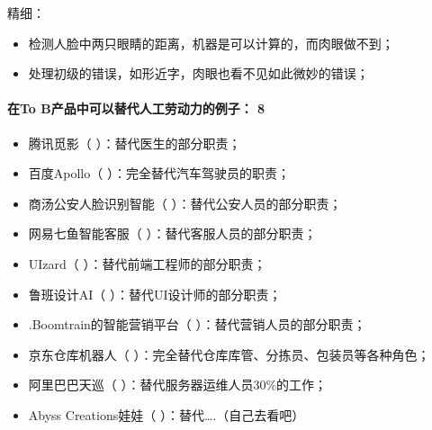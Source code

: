 \documentclass[letterpaper,10pt,english]{sphinxmanual}
\begin{document}
精细：
\begin{itemize}
\item {} 
检测人脸中两只眼睛的距离，机器是可以计算的，而肉眼做不到；

\item {} 
处理初级的错误，如形近字，肉眼也看不见如此微妙的错误；

\end{itemize}


\paragraph{在To B产品中可以替代人工劳动力的例子： 8\sphinxfootnotemark[234]}
\label{\detokenize{chapter_introduction/AI:to-b-8}}%
\begin{footnotetext}[234]\sphinxAtStartFootnote
{}
%
\end{footnotetext}\ignorespaces \begin{itemize}
\item {} 
腾讯觅影（ ）：替代医生的部分职责；

\item {} 
百度Apollo（ ）：完全替代汽车驾驶员的职责；

\item {} 
商汤\sphinxhyphen{}公安人脸识别智能（
）：替代公安人员的部分职责；

\item {} 
网易七鱼\sphinxhyphen{}智能客服（ ）：替代客服人员的部分职责；

\item {} 
UIzard（ ）：替代前端工程师的部分职责；

\item {} 
鲁班设计AI（ ）：替代UI设计师的部分职责；

\item {} 
.Boomtrain的智能营销平台（
）：替代营销人员的部分职责；

\item {} 
京东仓库机器人（
）：完全替代仓库库管、分拣员、包装员等各种角色；

\item {} 
阿里巴巴天巡（ ）：替代服务器运维人员30\%的工作；

\item {} 
Abyss Creations娃娃（ ）：替代….（自己去看吧）

\end{itemize}
\end{document}
